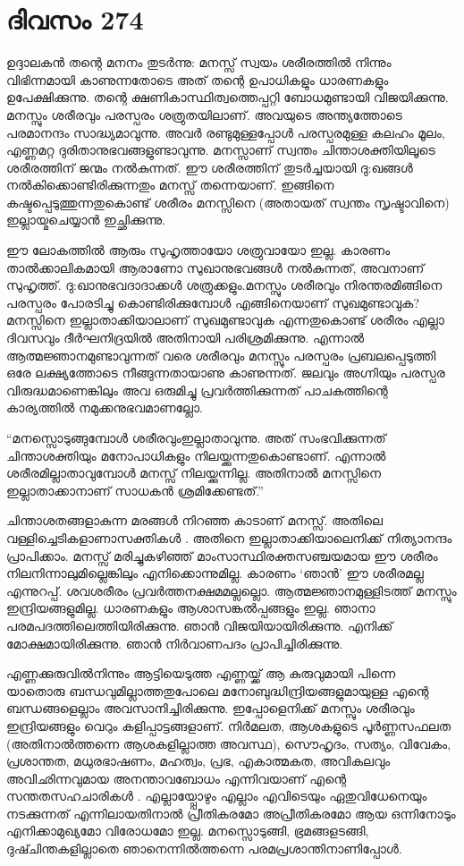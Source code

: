 \section{ദിവസം 274}


ഉദ്ദാലകന്‍ തന്റെ മനനം തുടര്‍ന്നു: മനസ്സ് സ്വയം ശരീരത്തില്‍ നിന്നും വിഭിന്നമായി കാണുന്നതോടെ അത് തന്റെ ഉപാധികളും ധാരണകളും ഉപേക്ഷിക്കുന്നു. തന്റെ ക്ഷണികാസ്ഥിത്വത്തെപ്പറ്റി ബോധമുണ്ടായി വിജയിക്കുന്നു. മനസ്സും ശരീരവും പരസ്പരം ശത്രുതയിലാണ്. അവയുടെ അന്ത്യത്തോടെ പരമാനന്ദം സാദ്ധ്യമാവുന്നു. അവര്‍ രണ്ടുമുള്ളപ്പോള്‍ പരസ്പരമുള്ള കലഹം മൂലം, എണ്ണമറ്റ ദുരിതാനുഭവങ്ങളുണ്ടാവുന്നു. മനസ്സാണ് സ്വന്തം ചിന്താശക്തിയിലൂടെ ശരീരത്തിന് ജന്മം നല്‍കുന്നത്. ഈ ശരീരത്തിന് തുടര്‍ച്ചയായി ദു:ഖങ്ങള്‍ നല്‍കിക്കൊണ്ടിരിക്കുന്നതും മനസ്സ് തന്നെയാണ്. ഇങ്ങിനെ കഷ്ടപ്പെടുത്തുന്നതുകൊണ്ട് ശരീരം മനസ്സിനെ (അതായത് സ്വന്തം സൃഷ്ടാവിനെ) ഇല്ലായ്മചെയ്യാന്‍ ഇച്ഛിക്കുന്നു.     

ഈ ലോകത്തില്‍ ആരും സുഹൃത്തായോ ശത്രുവായോ ഇല്ല. കാരണം താല്‍ക്കാലികമായി ആരാണോ സുഖാനുഭവങ്ങള്‍ നല്‍കുന്നത്, അവനാണ് സുഹൃത്ത്. ദു:ഖാനുഭവദാദാക്കള്‍ ശത്രുക്കളും.മനസ്സും ശരീരവും നിരന്തരമിങ്ങിനെ പരസ്പരം പോരടിച്ചു കൊണ്ടിരിക്കുമ്പോള്‍ എങ്ങിനെയാണ് സുഖമുണ്ടാവുക? മനസ്സിനെ ഇല്ലാതാക്കിയാലാണ് സുഖമുണ്ടാവുക എന്നതുകൊണ്ട് ശരീരം എല്ലാ ദിവസവും ദീര്‍ഘനിദ്രയില്‍ അതിനായി പരിശ്രമിക്കുന്നു. എന്നാല്‍ ആത്മജ്ഞാനമുണ്ടാവുന്നത് വരെ ശരീരവും മനസ്സും പരസ്പരം പ്രബലപ്പെടുത്തി ഒരേ ലക്ഷ്യത്തോടെ നീങ്ങുന്നതായാണു കാണുന്നത്. ജലവും അഗ്നിയും പരസ്പര വിരുദ്ധമാണെങ്കിലും അവ ഒരുമിച്ചു പ്രവര്‍ത്തിക്കുന്നത് പാചകത്തിന്റെ കാര്യത്തില്‍ നമുക്കനുഭവമാണല്ലോ.

“മനസ്സൊടുങ്ങുമ്പോള്‍ ശരീരവുംഇല്ലാതാവുന്നു. അത് സംഭവിക്കുന്നത് ചിന്താശക്തിയും മനോപാധികളും നിലയ്ക്കുന്നതുകൊണ്ടാണ്. എന്നാല്‍ ശരീരമില്ലാതാവുമ്പോള്‍ മനസ്സ് നിലയ്ക്കുന്നില്ല. അതിനാല്‍ മനസ്സിനെ ഇല്ലാതാക്കാനാണ് സാധകന്‍ ശ്രമിക്കേണ്ടത്.”

 ചിന്താശതങ്ങളാകുന്ന മരങ്ങള്‍ നിറഞ്ഞ കാടാണ് മനസ്സ്. അതിലെ വള്ളിച്ചെടികളാണാസക്തികള്‍ .  അതിനെ ഇല്ലാതാക്കിയാലെനിക്ക് നിത്യാനന്ദം പ്രാപിക്കാം. മനസ്സ് മരിച്ചുകഴിഞ്ഞ് മാംസാസ്ഥിരക്തസഞ്ചയമായ ഈ ശരീരം നിലനിന്നാലുമില്ലെങ്കിലും എനിക്കൊന്നുമില്ല. കാരണം ‘ഞാന്‍’ ഈ ശരീരമല്ല എന്നുറപ്പ്. ശവശരീരം പ്രവര്‍ത്തനക്ഷമമല്ലല്ലൊ. ആത്മജ്ഞാനമുള്ളിടത്ത് മനസ്സും ഇന്ദ്രിയങ്ങളുമില്ല. ധാരണകളും ആശാസങ്കല്‍പ്പങ്ങളും ഇല്ല. ഞാനാ പരമപദത്തിലെത്തിയിരിക്കുന്നു. ഞാന്‍ വിജയിയായിരിക്കുന്നു. എനിക്ക് മോക്ഷമായിരിക്കുന്നു. ഞാന്‍ നിര്‍വാണപദം പ്രാപിച്ചിരിക്കുന്നു.
  
എണ്ണക്കുരുവില്‍നിന്നും ആട്ടിയെടുത്ത എണ്ണയ്ക്ക് ആ കുരുവുമായി പിന്നെ യാതൊരു ബന്ധവുമില്ലാത്തതുപോലെ മനോബുദ്ധിന്ദ്രിയങ്ങളുമായുള്ള എന്റെ ബന്ധങ്ങളെല്ലാം അവസാനിച്ചിരിക്കുന്നു. ഇപ്പോളെനിക്ക് മനസ്സും ശരീരവും ഇന്ദ്രിയങ്ങളും വെറും കളിപ്പാട്ടങ്ങളാണ്.
നിര്‍മലത, ആശകളുടെ പൂര്‍ണ്ണസഫലത (അതിനാല്‍ത്തന്നെ ആശകളില്ലാത്ത അവസ്ഥ), സൌഹൃദം, സത്യം, വിവേകം, പ്രശാന്തത, മധുരഭാഷണം, മഹത്വം, പ്രഭ, എകാത്മകത, അവികലവും അവിഛിന്നവുമായ അനന്താവബോധം എന്നിവയാണ് എന്റെ സന്തതസഹചാരികള്‍ . എല്ലായ്പ്പോഴും എല്ലാം എവിടെയും ഏതുവിധേനെയും നടക്കുന്നത് എന്നിലായതിനാല്‍ പ്രീതികരമോ അപ്രീതികരമോ ആയ ഒന്നിനോടും എനിക്കാമുഖ്യമോ വിരോധമോ ഇല്ല. മനസ്സൊടുങ്ങി, ഭ്രമങ്ങളടങ്ങി, ദുഷ്ചിന്തകളില്ലാതെ ഞാനെന്നില്‍ത്തന്നെ പരമപ്രശാന്തിനാണിപ്പോള്‍.
